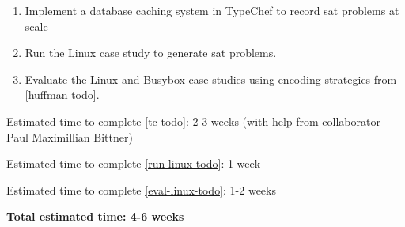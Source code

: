 \begin{enumerate}
\item\label{tc-todo} Implement a database caching system in TypeChef to record \ac{sat}
  problems at scale
\item\label{run-linux-todo} Run the Linux case study to generate \ac{sat}
  problems.
\item\label{eval-linux-todo} Evaluate the Linux and Busybox case studies using
  encoding strategies from \autoref{huffman-todo}.
\end{enumerate}

Estimated time to complete \autoref{tc-todo}: 2-3 weeks (with help from
collaborator Paul Maximillian Bittner)

Estimated time to complete \autoref{run-linux-todo}: 1 week

Estimated time to complete \autoref{eval-linux-todo}: 1-2 weeks

\textbf{Total estimated time: 4-6 weeks}


